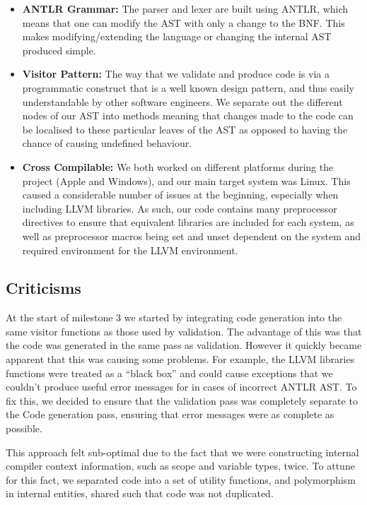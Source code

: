 \documentclass[a4wide, 11pt]{article}
\begin{document}
\begin{itemize}
\item
\textbf{ANTLR Grammar:} The parser and lexer are built using ANTLR, which means that one can modify the AST with only a change to the BNF. This makes modifying/extending the language or changing the internal AST produced simple.
\item
\textbf{Visitor Pattern:} The way that we validate and produce code is via a programmatic construct that is a well known design pattern, and thus easily understandable by other software engineers. We separate out the different nodes of our AST into methods meaning that changes made to the code can be localised to these particular leaves of the AST as opposed to having the chance of causing undefined behaviour. 
\item
\textbf{Cross Compilable:} We both worked on different platforms during the project (Apple and Windows), and our main target system was Linux. This caused a considerable number of issues at the beginning, especially when including LLVM libraries. As such, our code contains many preprocessor directives to ensure that equivalent libraries are included for each system, as well as preprocessor macros being set and unset dependent on the system and required environment for the LLVM environment.
\end{itemize}

\subsection{Criticisms}

At the start of milestone 3 we started by integrating code generation into the same visitor functions as those used by validation. The advantage of this was that the code was generated in the same pass as validation. However it quickly became apparent that this was causing some problems. For example, the LLVM libraries functions were treated as a ``black box'' and could cause exceptions that we couldn't produce useful error messages for in cases of incorrect ANTLR AST. To fix this, we decided to ensure that the validation pass was completely separate to the Code generation pass, ensuring that error messages were as complete as possible.

This approach felt sub-optimal due to the fact that we were constructing internal compiler context information, such as scope and variable types, twice. To attune for this fact, we separated code into a set of utility functions, and polymorphism in internal entities, shared such that code was not duplicated.
\end{document}
